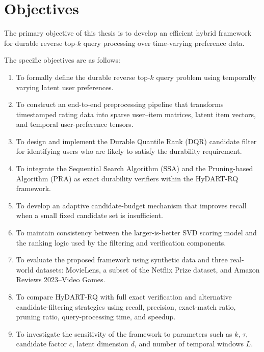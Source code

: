 
\section{Objectives}
\label{sec:objectives}

The primary objective of this thesis is to develop an efficient hybrid framework for durable reverse top-$k$ query processing over time-varying preference data.

The specific objectives are as follows:

\begin{enumerate}

\item To formally define the durable reverse top-$k$ query problem using temporally varying latent user preferences.

\item To construct an end-to-end preprocessing pipeline that transforms timestamped rating data into sparse user--item matrices, latent item vectors, and temporal user-preference tensors.

\item To design and implement the Durable Quantile Rank (DQR) candidate filter for identifying users who are likely to satisfy the durability requirement.

\item To integrate the Sequential Search Algorithm (SSA) and the Pruning-based Algorithm (PRA) as exact durability verifiers within the HyDART-RQ framework.

\item To develop an adaptive candidate-budget mechanism that improves recall when a small fixed candidate set is insufficient.

\item To maintain consistency between the larger-is-better SVD scoring model and the ranking logic used by the filtering and verification components.

\item To evaluate the proposed framework using synthetic data and three real-world datasets: MovieLens, a subset of the Netflix Prize dataset, and Amazon Reviews 2023--Video Games.

\item To compare HyDART-RQ with full exact verification and alternative candidate-filtering strategies using recall, precision, exact-match ratio, pruning ratio, query-processing time, and speedup.

\item To investigate the sensitivity of the framework to parameters such as $k$, $\tau$, candidate factor $c$, latent dimension $d$, and number of temporal windows $L$.

\end{enumerate}

